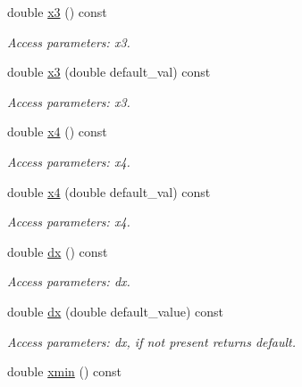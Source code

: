 \begin{DoxyCompactItemize}
double \hyperlink{struct_d_d4hep_1_1_x_m_l_1_1_dimension_a626f5ec600e69c8aa45d516a5e118357}{x3} () const 
\begin{DoxyCompactList}\small\item\em Access parameters: x3. \item\end{DoxyCompactList}\item 
double \hyperlink{struct_d_d4hep_1_1_x_m_l_1_1_dimension_a624dd865621b71e1d918358c62b5b654}{x3} (double default\_\-val) const 
\begin{DoxyCompactList}\small\item\em Access parameters: x3. \item\end{DoxyCompactList}\item 
double \hyperlink{struct_d_d4hep_1_1_x_m_l_1_1_dimension_a966ddadbb0efc6126d17ba74aa787c7b}{x4} () const 
\begin{DoxyCompactList}\small\item\em Access parameters: x4. \item\end{DoxyCompactList}\item 
double \hyperlink{struct_d_d4hep_1_1_x_m_l_1_1_dimension_a1830f57dfa5b6ee7a9af03705ba16455}{x4} (double default\_\-val) const 
\begin{DoxyCompactList}\small\item\em Access parameters: x4. \item\end{DoxyCompactList}\item 
double \hyperlink{struct_d_d4hep_1_1_x_m_l_1_1_dimension_a0fc64670a5130b6f673484c3027936a4}{dx} () const 
\begin{DoxyCompactList}\small\item\em Access parameters: dx. \item\end{DoxyCompactList}\item 
double \hyperlink{struct_d_d4hep_1_1_x_m_l_1_1_dimension_ab81e44eb14ad85a40038017f5a4910e4}{dx} (double default\_\-value) const 
\begin{DoxyCompactList}\small\item\em Access parameters: dx, if not present returns default. \item\end{DoxyCompactList}\item 
double \hyperlink{struct_d_d4hep_1_1_x_m_l_1_1_dimension_adc931b18c79a8373dbddff5f7dcc3760}{xmin} () const 

\end{DoxyCompactItemize}

